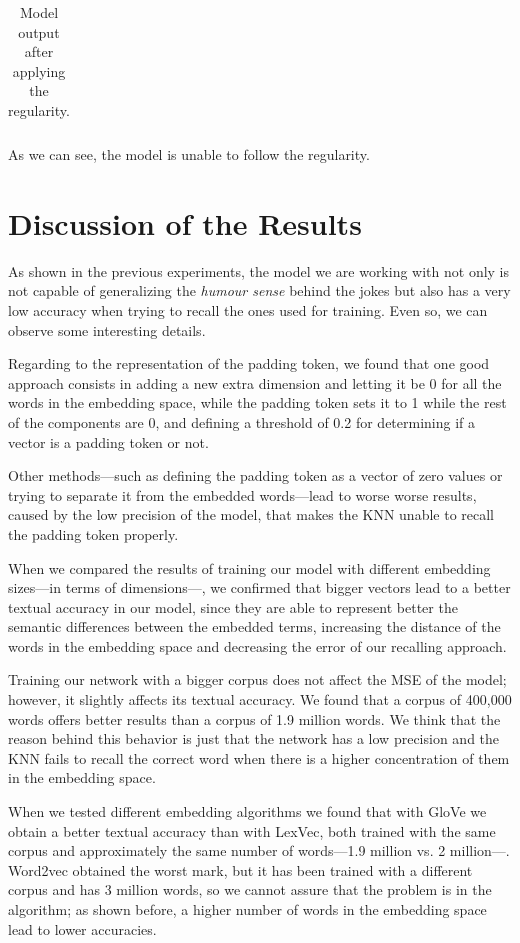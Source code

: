 \documentclass[]{article}
\begin{document}
\begin{table}[H]
\begin{tabular}{@{}ccc@{}}
		\end{tabular}
		\caption{Model output after applying the regularity.}
		\label{t:reg6}
	\end{table}
	
	As we can see, the model is unable to follow the regularity.
	
	\section{Discussion of the Results}
	
	As shown in the previous experiments, the model we are working with not only is not capable of generalizing the \emph{humour sense} behind the jokes but also has a very low accuracy when trying to recall the ones used for training. Even so, we can observe some interesting details.
	
	Regarding to the representation of the padding token, we found that one good approach consists in adding a new extra dimension and letting it be 0 for all the words in the embedding space, while the padding token sets it to 1 while the rest of the components are 0, and defining a threshold of 0.2 for determining if a vector is a padding token or not.
	
	Other methods---such as defining the padding token as a vector of zero values or trying to separate it from the embedded words---lead to worse worse results, caused by the low precision of the model, that makes the KNN unable to recall the padding token properly.
	
	When we compared the results of training our model with different embedding sizes---in terms of dimensions---, we confirmed that bigger vectors lead to a better textual accuracy in our model, since they are able to represent better the semantic differences between the embedded terms, increasing the distance of the words in the embedding space and decreasing the error of our recalling approach.
	
	Training our network with a bigger corpus does not affect the MSE of the model; however, it slightly affects its textual accuracy. We found that a corpus of 400,000 words offers better results than a corpus of 1.9 million words. We think that the reason behind this behavior is just that the network has a low precision and the KNN fails to recall the correct word when there is a higher concentration of them in the embedding space.
	
	When we tested different embedding algorithms we found that with GloVe we obtain a better textual accuracy than with LexVec, both trained with the same corpus and approximately the same number of words---1.9 million vs. 2 million---. Word2vec obtained the worst mark, but it has been trained with a different corpus and has 3 million words, so we cannot assure that the problem is in the algorithm; as shown before, a higher number of words in the embedding space lead to lower accuracies.
	
\end{document}

